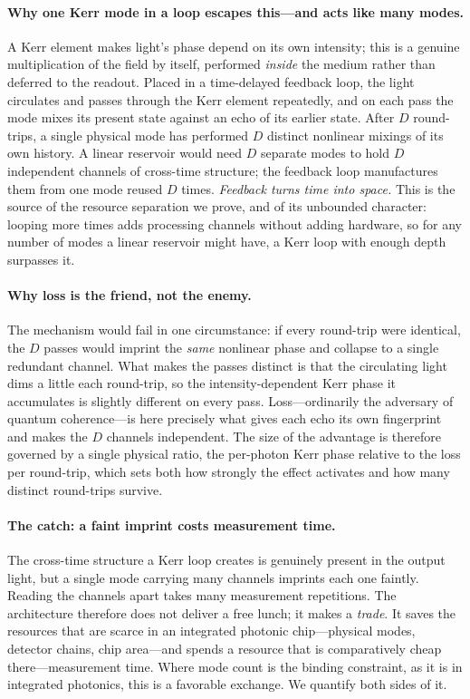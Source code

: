 \documentclass[11pt]{article}
\theoremstyle{remark}
\begin{document}
\paragraph{Why one Kerr mode in a loop escapes this---and acts like many modes.}
A Kerr element makes light's phase depend on its own intensity; this is a genuine
multiplication of the field by itself, performed \emph{inside} the medium rather
than deferred to the readout. Placed in a time-delayed feedback loop, the light
circulates and passes through the Kerr element repeatedly, and on each pass the mode
mixes its present state against an echo of its earlier state. After $D$ round-trips,
a single physical mode has performed $D$ distinct nonlinear mixings of its own
history. A linear reservoir would need $D$ separate modes to hold $D$ independent
channels of cross-time structure; the feedback loop manufactures them from one mode
reused $D$ times. \emph{Feedback turns time into space.} This is the source of the
resource separation we prove, and of its unbounded character: looping more times
adds processing channels without adding hardware, so for any number of modes a
linear reservoir might have, a Kerr loop with enough depth surpasses it.

\paragraph{Why loss is the friend, not the enemy.}
The mechanism would fail in one circumstance: if every round-trip were identical, the
$D$ passes would imprint the \emph{same} nonlinear phase and collapse to a single
redundant channel. What makes the passes distinct is that the circulating light dims
a little each round-trip, so the intensity-dependent Kerr phase it accumulates is
slightly different on every pass. Loss---ordinarily the adversary of quantum
coherence---is here precisely what gives each echo its own fingerprint and makes the
$D$ channels independent. The size of the advantage is therefore governed by a
single physical ratio, the per-photon Kerr phase relative to the loss per
round-trip, which sets both how strongly the effect activates and how many distinct
round-trips survive.

\paragraph{The catch: a faint imprint costs measurement time.}
The cross-time structure a Kerr loop creates is genuinely present in the output
light, but a single mode carrying many channels imprints each one faintly. Reading
the channels apart takes many measurement repetitions. The architecture therefore
does not deliver a free lunch; it makes a \emph{trade}. It saves the resources that
are scarce in an integrated photonic chip---physical modes, detector chains, chip
area---and spends a resource that is comparatively cheap there---measurement time.
Where mode count is the binding constraint, as it is in integrated photonics, this
is a favorable exchange. We quantify both sides of it.
\end{document}
